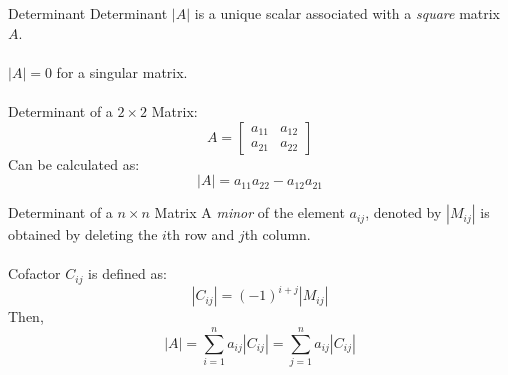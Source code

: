 \documentclass{./../../Latex/teaching_slides}
\begin{document}
\begin{frame}{Determinant}
 Determinant $|A|$ is a unique scalar associated with a \textit{square} matrix $A$. \\~\\
 $|A|=0$ for a singular matrix. \\~\\
 Determinant of a $2 \times 2$ Matrix:
 $$ A=\left[\begin{array}{ll}a_{11} & a_{12} \\ a_{21} & a_{22}\end{array}\right] $$
 Can be calculated as:
 $$ |A|=a_{11} a_{22}-a_{12} a_{21} $$  
 \end{frame}
 
 
\begin{frame}{Determinant of a $n \times n$ Matrix}
A \textit{minor} of the element $a_{ij}$, denoted by $|M_{ij}|$ is obtained by deleting the $i$th row and $j$th column. \\~\\
Cofactor $C_{ij}$ is defined as:
$$ |C_{ij}| = (-1)^{i+j} |M_{ij}| $$
 Then, 
 $$|A| = \sum_{i=1}^n a_{ij} |C_{ij}| = \sum_{j=1}^n a_{ij} |C_{ij}| $$
 \end{frame}
 
\end{document}
